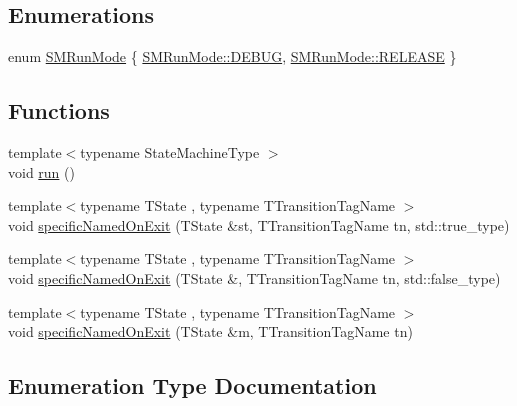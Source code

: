 \subsection*{Enumerations}
\begin{DoxyCompactItemize}
\item 
enum \hyperlink{namespacesmacc_a3e4f79486ea6ea6342dd3c712d16a4f6}{S\+M\+Run\+Mode} \{ \hyperlink{namespacesmacc_a3e4f79486ea6ea6342dd3c712d16a4f6adc30ec20708ef7b0f641ef78b7880a15}{S\+M\+Run\+Mode\+::\+D\+E\+B\+UG}, 
\hyperlink{namespacesmacc_a3e4f79486ea6ea6342dd3c712d16a4f6a7d649ef069df9885e382417c79f3d5cd}{S\+M\+Run\+Mode\+::\+R\+E\+L\+E\+A\+SE}
 \}
\end{DoxyCompactItemize}
\subsection*{Functions}
\begin{DoxyCompactItemize}
\item 
{\footnotesize template$<$typename State\+Machine\+Type $>$ }\\void \hyperlink{namespacesmacc_a47ac3b8d2968b1ba4152afd64ab66bd0}{run} ()
\item 
{\footnotesize template$<$typename T\+State , typename T\+Transition\+Tag\+Name $>$ }\\void \hyperlink{namespacesmacc_afd94fcb8f8c410a0ced7954bf76e845d}{specific\+Named\+On\+Exit} (T\+State \&st, T\+Transition\+Tag\+Name tn, std\+::true\+\_\+type)
\item 
{\footnotesize template$<$typename T\+State , typename T\+Transition\+Tag\+Name $>$ }\\void \hyperlink{namespacesmacc_ab1896cb023506b0a47d26d32cc078eb4}{specific\+Named\+On\+Exit} (T\+State \&, T\+Transition\+Tag\+Name tn, std\+::false\+\_\+type)
\item 
{\footnotesize template$<$typename T\+State , typename T\+Transition\+Tag\+Name $>$ }\\void \hyperlink{namespacesmacc_ad462e5c9a025fe42bb06de617fabeaa5}{specific\+Named\+On\+Exit} (T\+State \&m, T\+Transition\+Tag\+Name tn)
\end{DoxyCompactItemize}


\subsection{Enumeration Type Documentation}
\mbox{\label{namespacesmacc_a3e4f79486ea6ea6342dd3c712d16a4f6}} 
